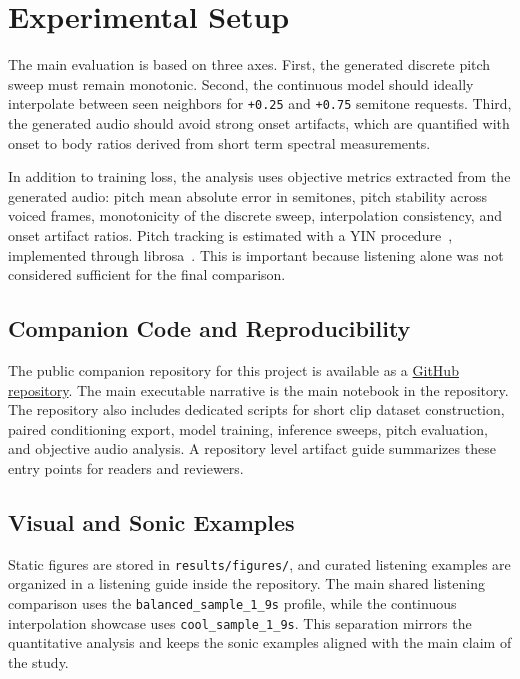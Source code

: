 \documentclass{article}
\newcommand{\projecturl}{\href{https://github.com/manueleco/pitch-conditioning-study}{GitHub repository}}
\begin{document}
\section{Experimental Setup}\label{sec:experimental_setup}

The main evaluation is based on three axes. First, the generated discrete pitch sweep must remain monotonic. Second, the continuous model should ideally interpolate between seen neighbors for \texttt{+0.25} and \texttt{+0.75} semitone requests. Third, the generated audio should avoid strong onset artifacts, which are quantified with onset to body ratios derived from short term spectral measurements.

In addition to training loss, the analysis uses objective metrics extracted from the generated audio: pitch mean absolute error in semitones, pitch stability across voiced frames, monotonicity of the discrete sweep, interpolation consistency, and onset artifact ratios. Pitch tracking is estimated with a YIN procedure~\cite{decheveigne2002yin}, implemented through librosa~\cite{mcfee2015librosa}. This is important because listening alone was not considered sufficient for the final comparison.

\subsection{Companion Code and Reproducibility}\label{subsec:companion_code}

The public companion repository for this project is available as a \projecturl. The main executable narrative is the main notebook in the repository. The repository also includes dedicated scripts for short clip dataset construction, paired conditioning export, model training, inference sweeps, pitch evaluation, and objective audio analysis. A repository level artifact guide summarizes these entry points for readers and reviewers.

\subsection{Visual and Sonic Examples}\label{subsec:visual_and_sonic_examples}

Static figures are stored in \texttt{results/figures/}, and curated listening examples are organized in a listening guide inside the repository. The main shared listening comparison uses the \texttt{balanced\_sample\_1\_9s} profile, while the continuous interpolation showcase uses \texttt{cool\_sample\_1\_9s}. This separation mirrors the quantitative analysis and keeps the sonic examples aligned with the main claim of the study.
\end{document}
